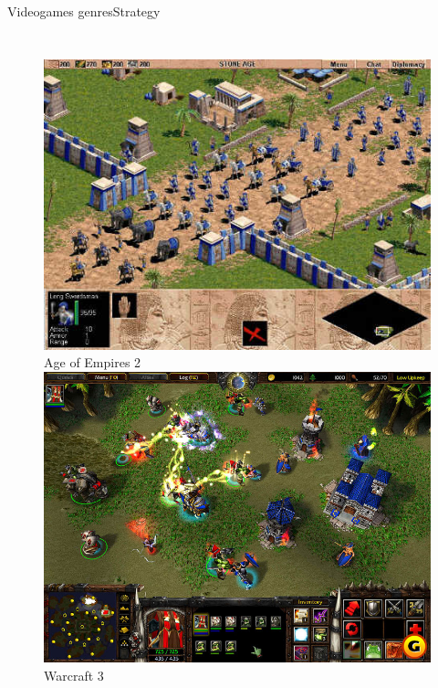 \documentclass[10pt,compress]{beamer} %
\begin{document}
\begin{frame}{Videogames genres}{Strategy}
\begin{columns}
   	 	\begin{figure}[t]
		\begin{center}
		    \includegraphics[width=0.9\linewidth]{figs/age-of-empires}\\Age of Empires 2\\
		    \includegraphics[width=0.9\linewidth]{figs/warcraft}\\Warcraft 3
		\end{center}
   	 	\end{figure}
    \end{columns}
\end{frame}
\end{document}

